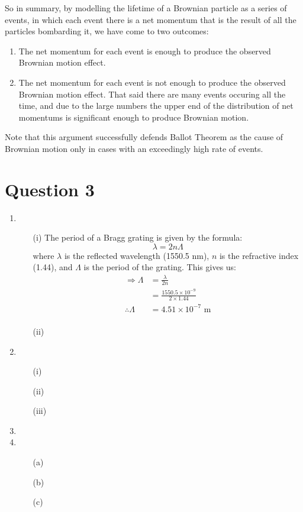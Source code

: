 \documentclass[10pt,a4paper]{article}
\begin{document}
\begin{itemize}
	So in summary, by modelling the lifetime of a Brownian particle as a series of events, in which each event there is a net momentum that is the result of all the particles bombarding it, we have come to two outcomes:
		\begin{enumerate}
			\item The net momentum for each event is enough to produce the observed Brownian motion effect.
			\item The net momentum for each event is not enough to produce the observed Brownian motion effect. That said there are many events occuring all the time, and due to the large numbers the upper end of the distribution of net momentums is significant enough to produce Brownian motion.
		\end{enumerate}

	Note that this argument successfully defends Ballot Theorem as the cause of Brownian motion only in cases with an exceedingly high rate of events.
\end{itemize}

\section*{Question 3}

\begin{enumerate}
	\item 
		\begin{itemize}
			\item[(i)] The period of a Bragg grating is given by the formula:
				\begin{equation*}
					\lambda = 2 n \Lambda
				\end{equation*}
				where $\lambda$ is the reflected wavelength (1550.5 nm), $n$ is the refractive index (1.44), and $\Lambda$ is the period of the grating. This gives us:
				\begin{align*}
					\Rightarrow \Lambda &= \frac{\lambda}{2n} \\
					 &= \frac{1550.5 \times 10^{-9}}{2 \times 1.44} \\
					\therefore \Lambda &= 4.51 \times 10^{-7} \mbox{ m} \\
				\end{align*}
			\item[(ii)]
		\end{itemize}
	\item
		\begin{itemize}
			\item[(i)]
			\item[(ii)]
			\item[(iii)]
		\end{itemize}
	\item
	\item
		\begin{itemize}
			\item[(a)]
			\item[(b)]
			\item[(c)]
		\end{itemize}
\end{enumerate}
\end{document}

